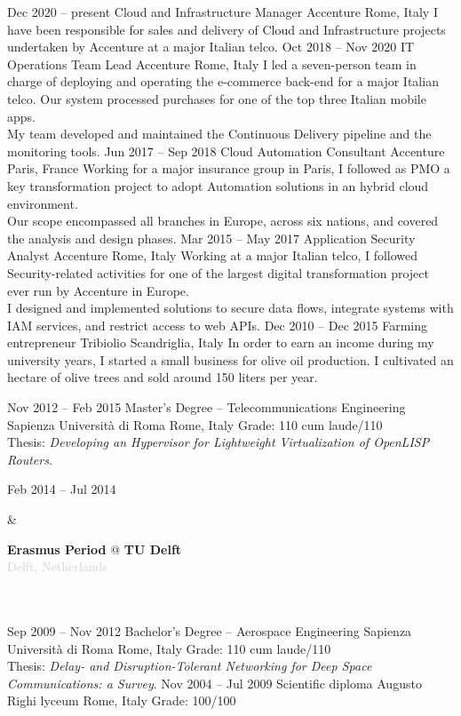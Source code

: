 \documentclass[9pt]{developercv}
\begin{document}
\begin{entrylist}
	\entry
		{Dec 2020 -- present}
		{Cloud and Infrastructure Manager}
		{Accenture}
		{Rome, Italy}
		{
			I have been responsible for sales and delivery of Cloud and Infrastructure projects undertaken by Accenture at a major Italian telco.
		}
	\entry
		{Oct 2018 -- Nov 2020}
		{IT Operations Team Lead}
		{Accenture}
		{Rome, Italy}
		{
			I led a seven-person team in charge of deploying and operating the e-commerce back-end for a major Italian telco. Our system processed purchases for one of the top three Italian mobile apps.
			\\
			My team developed and maintained the Continuous Delivery pipeline and the monitoring tools.
		}
	\entry
		{Jun 2017 -- Sep 2018}
		{Cloud Automation Consultant}
		{Accenture}
		{Paris, France}
		{
			Working for a major insurance group in Paris, I followed as PMO a key transformation project to adopt Automation solutions in an hybrid cloud environment.
			\\
			Our scope encompassed all branches in Europe, across six nations, and covered the analysis and design phases.
		}
	\entry
		{Mar 2015 -- May 2017}
		{Application Security Analyst}
		{Accenture}
		{Rome, Italy}
		{
			Working at a major Italian telco, I followed Security-related activities for one of the largest digital transformation project ever run by Accenture in Europe.
			\\
			I designed and implemented solutions to secure data flows, integrate systems with IAM services, and restrict access to web APIs.
		}
	\entry
		{Dec 2010 -- Dec 2015}
		{Farming entrepreneur}
		{Tribiolio}
		{Scandriglia, Italy}
		{
			In order to earn an income during my university years, I started a small business for olive oil production. I cultivated an hectare of olive trees and sold around 150 liters per year.
		}
\end{entrylist}


\begin{entrylist}
	\entry
		{Nov 2012 -- Feb 2015}
		{Master’s Degree -- Telecommunications Engineering}
		{Sapienza Università di Roma}
		{Rome, Italy}
		{
			Grade: 110 cum laude/110
			\\
			Thesis: \textit{Developing an Hypervisor for Lightweight Virtualization of OpenLISP Routers}.
		}
		\parbox[t]{0.2\textwidth}{
			Feb 2014 -- Jul 2014
		}
		&\parbox[t]{0.8\textwidth}{
			\textbf{Erasmus Period} @ \textbf{TU Delft}
			\\
			\textcolor{lightgrey}{Delft, Netherlands}
		}\\\\
	\entry
		{Sep 2009 -- Nov 2012}
		{Bachelor’s Degree -- Aerospace Engineering}
		{Sapienza Università di Roma}
		{Rome, Italy}
		{
			Grade: 110 cum laude/110
			\\
			Thesis: \textit{Delay- and Disruption-Tolerant Networking for Deep Space Communications: a Survey}.
		}
	\entry
		{Nov 2004 -- Jul 2009}
		{Scientific diploma}
		{Augusto Righi lyceum}
		{Rome, Italy}
		{Grade: 100/100}
\end{entrylist}
\end{document}
